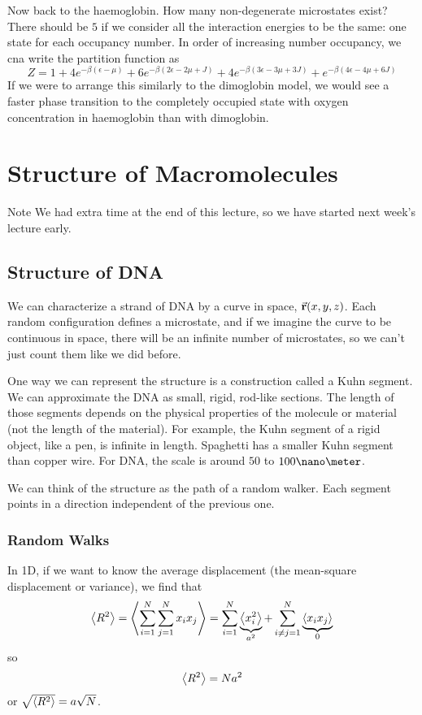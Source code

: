 \documentclass[a4paper,twoside,master.tex]{subfiles}
\begin{document}
\begin{ex}
    Now back to the haemoglobin. How many non-degenerate microstates exist? There should be $ 5 $ if we consider all the interaction energies to be the same: one state for each occupancy number. In order of increasing number occupancy, we cna write the partition function as
    \begin{equation}
        Z = 1 + 4 e^{- \beta (\epsilon - \mu)} + 6 e^{- \beta (2 \epsilon - 2 \mu + J)} + 4 e^{- \beta (3 \epsilon - 3 \mu + 3 J)} + e^{- \beta (4 \epsilon - 4 \mu + 6 J)}
    \end{equation}
    If we were to arrange this similarly to the dimoglobin model, we would see a faster phase transition to the completely occupied state with oxygen concentration in haemoglobin than with dimoglobin.
\end{ex}

\chapter{Structure of Macromolecules}
\begin{note}{Note}
    We had extra time at the end of this lecture, so we have started next week's lecture early.
\end{note}

\section{Structure of DNA}\label{sec:structure_of_dna}

We can characterize a strand of DNA by a curve in space, $ \va{r}(x,y,z) $. Each random configuration defines a microstate, and if we imagine the curve to be continuous in space, there will be an infinite number of microstates, so we can't just count them like we did before.

One way we can represent the structure is a construction called a Kuhn segment. We can approximate the DNA as small, rigid, rod-like sections. The length of those segments depends on the physical properties of the molecule or material (not the length of the material). For example, the Kuhn segment of a rigid object, like a pen, is infinite in length. Spaghetti has a smaller Kuhn segment than copper wire. For DNA, the scale is around $ 50 $ to $ 100\nano\meter $.

We can think of the structure as the path of a random walker. Each segment points in a direction independent of the previous one.

\subsection{Random Walks}\label{sub:random_walks}

In 1D, if we want to know the average displacement (the mean-square displacement or variance), we find that
\begin{equation}
    \ev{R^2} = \ev{\sum_{i=1}^{N} \sum_{j=1}^{N} x_i x_j} = \sum_{i=1}^{N} \underbrace{\ev{x_i^2}}_{a^2} + \sum_{i \neq j=1}^{N} \underbrace{\ev{x_i x_j}}_{0}
\end{equation}
so
\begin{equation}
    \ev{R^2} = N a^2
\end{equation}
or $ \sqrt{\ev{R^2}} = a \sqrt{N} $.
\end{document}
